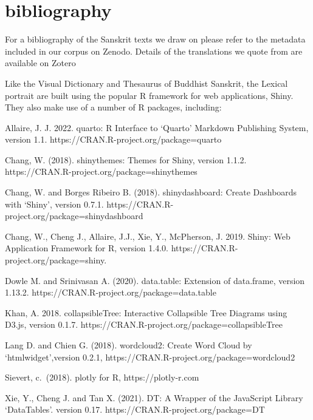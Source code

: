 \documentclass[
  letterpaper,
  DIV=11,
  numbers=noendperiod,
  oneside]{scrreprt}
\begin{document}

\hypertarget{bibliography}{%
\chapter{bibliography}\label{bibliography}}

For a bibliography of the Sanskrit texts we draw on please refer to the
metadata included in our corpus on Zenodo. Details of the translations
we quote from are available on Zotero

Like the Visual Dictionary and Thesaurus of Buddhist Sanskrit, the
Lexical portrait are built using the popular R framework for web
applications, Shiny. They also make use of a number of R packages,
including:

Allaire, J. J. 2022. quarto: R Interface to `Quarto' Markdown Publishing
System, version 1.1. https://CRAN.R-project.org/package=quarto

Chang, W. (2018). shinythemes: Themes for Shiny, version 1.1.2.
https://CRAN.R-project.org/package=shinythemes

Chang, W. and Borges Ribeiro B. (2018). shinydashboard: Create
Dashboards with `Shiny', version 0.7.1.
https://CRAN.R-project.org/package=shinydashboard

Chang, W., Cheng J., Allaire, J.J., Xie, Y., McPherson, J. 2019. Shiny:
Web Application Framework for R, version 1.4.0.
https://CRAN.R-project.org/package=shiny.

Dowle M. and Srinivasan A. (2020). data.table: Extension of data.frame,
version 1.13.2. https://CRAN.R-project.org/package=data.table

Khan, A. 2018. collapsibleTree: Interactive Collapsible Tree Diagrams
using D3.js, version 0.1.7.
https://CRAN.R-project.org/package=collapsibleTree

Lang D. and Chien G. (2018). wordcloud2: Create Word Cloud by
`htmlwidget',version 0.2.1,
https://CRAN.R-project.org/package=wordcloud2

Sievert, c.~(2018). plotly for R, https://plotly-r.com

Xie, Y., Cheng J. and Tan X. (2021). DT: A Wrapper of the JavaScript
Library `DataTables'. version 0.17.
https://CRAN.R-project.org/package=DT
\end{document}
